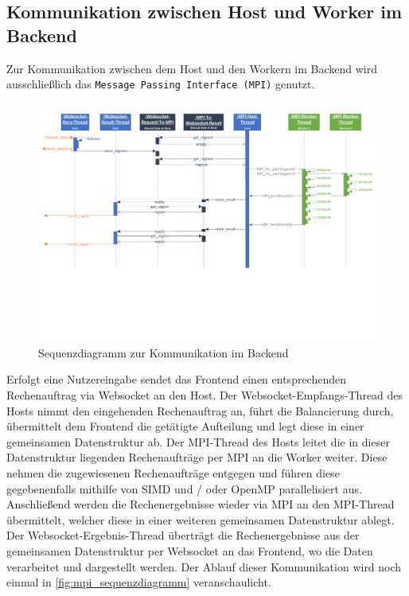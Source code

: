 \subsection{Kommunikation zwischen Host und Worker im Backend}

Zur Kommunikation zwischen dem Host und den Workern im Backend wird ausschließlich das \verb|Message Passing Interface (MPI)| genutzt.

\begin{figure}[p]
	\hspace{20mm}
	\includegraphics[angle = 90, origin = c, trim = 0mm 0mm 0mm 0mm, clip, width=0.98\linewidth]{img/Implementierung/MPISequenzdiagrammFarben.pdf}
	\caption{Sequenzdiagramm zur Kommunikation im Backend}
	\label{fig:mpi_sequenzdiagramm}
\end{figure}

Erfolgt eine Nutzereingabe sendet das Frontend einen entsprechenden Rechenauftrag via Websocket an den Host.
Der Websocket-Empfangs-Thread des Hosts nimmt den eingehenden Rechenauftrag an, führt die Balancierung durch,
übermittelt dem Frontend die getätigte Aufteilung und legt diese in einer gemeinsamen Datenstruktur ab.
Der MPI-Thread des Hosts leitet die in dieser Datenstruktur liegenden Rechenaufträge per MPI an die Worker weiter.
Diese nehmen die zugewiesenen Rechenaufträge entgegen und führen diese gegebenenfalls mithilfe von SIMD und / oder OpenMP parallelisiert aus.
Anschließend werden die Rechenergebnisse wieder via MPI an den MPI-Thread übermittelt,
welcher diese in einer weiteren gemeinsamen Datenstruktur ablegt.
Der Websocket-Ergebnis-Thread überträgt die Rechenergebnisse aus der gemeinsamen Datenstruktur per Websocket an das Frontend, 
wo die Daten verarbeitet und dargestellt werden.
Der Ablauf dieser Kommunikation wird noch einmal in \autoref{fig:mpi_sequenzdiagramm} veranschaulicht.

